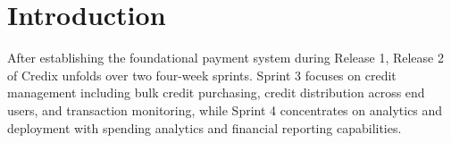 \section*{Introduction}

After establishing the foundational payment system during Release 1, Release 2 of Credix unfolds over two four-week sprints. Sprint 3 focuses on credit management including bulk credit purchasing, credit distribution across end users, and transaction monitoring, while Sprint 4 concentrates on analytics and deployment with spending analytics and financial reporting capabilities.
